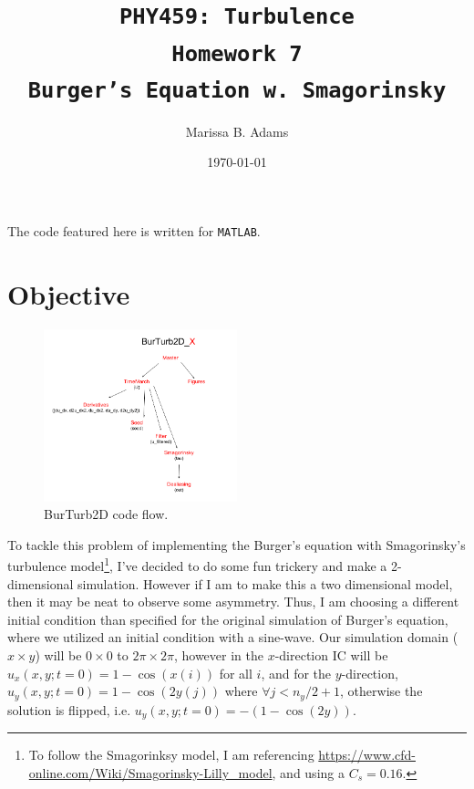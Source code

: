 \documentclass[12pt,twoside]{article}
\title{\Large \texttt{PHY459: Turbulence \\ 
				\Huge \textbf{Homework 7}\\ Burger's Equation w. Smagorinsky}}
\author{Marissa B. Adams}
\date{\today}
\begin{document}
\lstset{language=Matlab}  

\maketitle
\tableofcontents

\thispagestyle{fancy}



The code featured here is written for \texttt{MATLAB}.


\newpage

\section{Objective}

\begin{figure}[t!]
\centering
\includegraphics[width=0.5\textwidth]{Flow.png}
\caption{BurTurb2D code flow.} \label{fig:flow}
\end{figure}

To tackle this problem of implementing the Burger's equation with Smagorinsky's turbulence model\footnote{To follow the Smagorinksy model, I am referencing \href{https://www.cfd-online.com/Wiki/Smagorinsky-Lilly_model}{https://www.cfd-online.com/Wiki/Smagorinsky-Lilly\_model}, and using a $C_{s}=0.16$.}, I've decided to do some fun trickery and make a 2-dimensional simulation. However if I am to make this a two dimensional model, then it may be neat to observe some asymmetry. Thus, I am choosing a different initial condition than specified for the original simulation of Burger's equation, where we utilized an initial condition with a sine-wave. Our simulation domain ($x \times y$) will be $0\times0$ to $2\pi \times 2\pi$, however in the $x$-direction IC will be $u_{x}(x,y;t=0)=1-\cos(x(i))$ for all $i$, and for the $y$-direction, $u_{y}(x,y;t=0)=1-\cos(2y(j))$ where $\forall j<n_{y}/2 + 1$, otherwise the solution is flipped, i.e. $u_{y}(x,y;t=0)=-\left(1-\cos(2y)\right)$.
\end{document}
